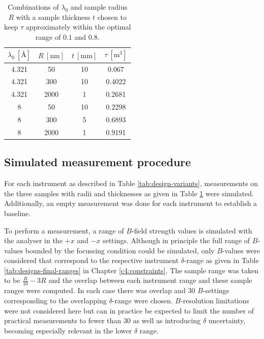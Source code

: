 \begin{table}[h!]
	\centering
	\begin{tabular}{cc|cc}
		\toprule
		$\lambda_0~[\unit{\angstrom}]$  & $R ~[\unit{\nano\meter}]$  & $t ~[\unit{\milli\meter}]$& $\tau~[\unit{\meter^3}]$ \\
		\midrule
		\num{4.321} & \num{50} & \num{10} & \num{0.067}\\
		\num{4.321} & \num{300} & \num{10} & \num{0.4022} \\
		\num{4.321} & \num{2000} & \num{1} & \num{0.2681} \\
		\num{8} & \num{50} & \num{10} & \num{0.2298} \\
		\num{8} & \num{300} & \num{5} & \num{0.6893} \\
		\num{8} & \num{2000} & \num{1} & \num{0.9191} \\
		\bottomrule
	\end{tabular}
	\caption{Combinations of $\lambda_0$ and sample radius $R$ with a sample thickness $t$ chosen to keep $\tau$ approximately within the optimal range of $0.1$ and $0.8$.}
	\label{tab:sample-thickness}
\end{table}

\subsection{Simulated measurement procedure}
For each instrument as described in Table \ref{tab:design-variants}, measurements on the three samples with radii and thicknesses as given in Table \ref{tab:sample-thickness} were simulated. Additionally, an empty measurement was done for each instrument to establish a baseline. 

To perform a measurement, a range of $B$-field strength values is simulated with the analyser in the $+x$ and $-x$ settings. Although in principle the full range of $B$-values bounded by the focussing condition could be simulated, only $B$-values were considered that correspond to the respective instrument $\delta$-range as given in Table \ref{tab:designs-final-ranges} in Chapter \ref{c4:constraints}. The sample range was taken to be $\frac{R}{10} - 3R$ and the overlap between each instrument range and these sample ranges were computed. In each case there was overlap and 30 $B$-settings corresponding to the overlapping $\delta$-range were chosen. $B$-resolution limitations were not considered here but can in practice be expected to limit the number of practical measurements to fewer than 30 as well as introducing $\delta$ uncertainty, becoming especially relevant in the lower $\delta$ range. 

